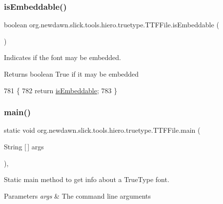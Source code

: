 \subsubsection{\texorpdfstring{is\+Embeddable()}{isEmbeddable()}}
{\footnotesize\ttfamily boolean org.\+newdawn.\+slick.\+tools.\+hiero.\+truetype.\+T\+T\+F\+File.\+is\+Embeddable (\begin{DoxyParamCaption}{ }\end{DoxyParamCaption})\hspace{0.3cm}{\ttfamily [inline]}}

Indicates if the font may be embedded. \begin{DoxyReturn}{Returns}
boolean True if it may be embedded 
\end{DoxyReturn}

\begin{DoxyCode}
781                                   \{
782         \textcolor{keywordflow}{return} \mbox{\hyperlink{classorg_1_1newdawn_1_1slick_1_1tools_1_1hiero_1_1truetype_1_1_t_t_f_file_a20d6304ebd3c4fad99b84415800dca63}{isEmbeddable}};
783     \}
\end{DoxyCode}
\mbox{\label{classorg_1_1newdawn_1_1slick_1_1tools_1_1hiero_1_1truetype_1_1_t_t_f_file_af5014f2d505b558d0dc0ffba5f9ce403}} 
\subsubsection{\texorpdfstring{main()}{main()}}
{\footnotesize\ttfamily static void org.\+newdawn.\+slick.\+tools.\+hiero.\+truetype.\+T\+T\+F\+File.\+main (\begin{DoxyParamCaption}\item[{String \mbox{[}$\,$\mbox{]}}]{args }\end{DoxyParamCaption})\hspace{0.3cm}{\ttfamily [inline]}, {\ttfamily [static]}}

Static main method to get info about a True\+Type font. 
\begin{DoxyParams}{Parameters}
{\em args} & The command line arguments \\
\hline
\end{DoxyParams}

